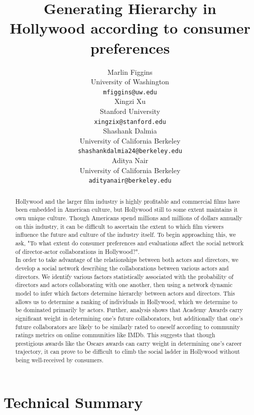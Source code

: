 \documentclass{article}
\title{ Generating Hierarchy in Hollywood according to consumer preferences }
\author{
 Marlin Figgins \\
  University of Washington \\
  \texttt{mfiggins@uw.edu} \\
   \And
 Xingzi Xu \\
  Stanford University \\
  \texttt{xingzix@stanford.edu} \\
  \AND
 Shashank Dalmia \\
  University of California Berkeley\\
  \texttt{shashankdalmia24@berkeley.edu} \\
  \And
 Aditya Nair \\
  University of California Berkeley\\
  \texttt{adityanair@berkeley.edu} \\
}
\begin{document}
\maketitle
\begin{abstract}
Hollywood and the larger film industry is highly profitable and commercial films have been embedded in American culture, but Hollywood still to some extent maintains it own unique culture. Though Americans spend millions and millions of dollars annually on this industry, it can be difficult to ascertain the extent to which film viewers influence the future and culture of the industry itself. To begin approaching this, we ask, "To what extent do consumer preferences and evaluations affect the social network of director-actor collaborations in Hollywood?".\\

In order to take advantage of the relationships between both actors and directors, we develop a social network describing the collaborations between various actors and directors. We identify various factors statistically associated with the probability of directors and actors collaborating with one another, then using a network dynamic model to infer which factors determine hierarchy between actors and directors. This allows us to determine a ranking of individuals in Hollywood, which we determine to be dominated primarily by actors. Further, analysis shows that Academy Awards carry significant weight in determining one's future collaborators, but additionally that one's future collaborators are likely to be similarly rated to oneself according to community ratings metrics on online communities like IMDb. This suggests that though prestigious awards like the Oscars awards can carry weight in determining one's career trajectory, it can prove to be difficult to climb the social ladder in Hollywood without being well-received by consumers.
\end{abstract}

\newpage %

\section{Technical Summary}
\end{document}
